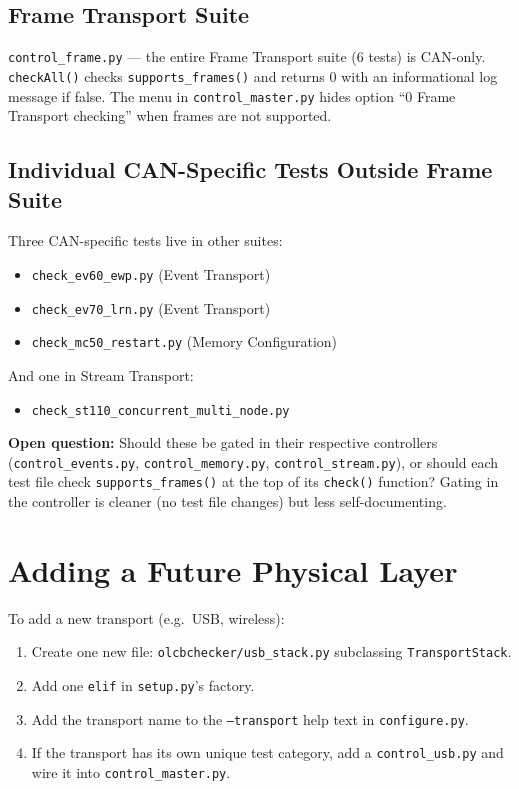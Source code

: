 \subsection{Frame Transport Suite}

\texttt{control\_frame.py} --- the entire Frame Transport suite (6 tests) is
CAN-only.  \texttt{checkAll()} checks \texttt{supports\_frames()} and returns
0 with an informational log message if false.  The menu in
\texttt{control\_master.py} hides option ``0 Frame Transport checking'' when
frames are not supported.

\subsection{Individual CAN-Specific Tests Outside Frame Suite}

Three CAN-specific tests live in other suites:

\begin{itemize}
\item \texttt{check\_ev60\_ewp.py} (Event Transport)
\item \texttt{check\_ev70\_lrn.py} (Event Transport)
\item \texttt{check\_mc50\_restart.py} (Memory Configuration)
\end{itemize}

And one in Stream Transport:

\begin{itemize}
\item \texttt{check\_st110\_concurrent\_multi\_node.py}
\end{itemize}

\textbf{Open question:} Should these be gated in their respective controllers
(\texttt{control\_events.py}, \texttt{control\_memory.py},
\texttt{control\_stream.py}), or should each test file check
\texttt{supports\_frames()} at the top of its \texttt{check()} function?
Gating in the controller is cleaner (no test file changes) but less
self-documenting.

\section{Adding a Future Physical Layer}

To add a new transport (e.g.\ USB, wireless):

\begin{enumerate}
\item Create one new file: \texttt{olcbchecker/usb\_stack.py} subclassing
    \texttt{TransportStack}.
\item Add one \texttt{elif} in \texttt{setup.py}'s factory.
\item Add the transport name to the \texttt{--transport} help text in
    \texttt{configure.py}.
\item If the transport has its own unique test category, add a
    \texttt{control\_usb.py} and wire it into \texttt{control\_master.py}.
\end{enumerate}

